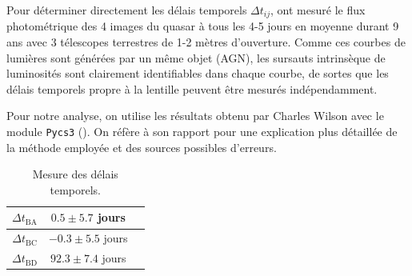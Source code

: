 \documentclass[times,10pt,twocolumn]{article}
\begin{document}
Pour déterminer directement les délais temporels $\Delta t_{ij}$, 
\citet{Tewes2013} ont mesuré le flux photométrique des 4 images du quasar à 
tous les 4-5 jours en moyenne durant 9 ans avec 3 télescopes terrestres de 
1-2 mètres d'ouverture. Comme ces courbes de lumières sont générées par un même objet (AGN), 
les sursauts intrinsèque de luminosités sont clairement identifiables dans chaque courbe, de 
sortes que les délais temporels propre à la lentille peuvent être mesurés indépendamment. 

Pour notre analyse, on utilise les résultats obtenu par Charles Wilson avec le 
module \texttt{Pycs3} (\citet{Millon2020}). On réfère à son rapport pour une explication 
plus détaillée de la méthode employée et des sources possibles d'erreurs.

\begin{table}[H]
        \centering
        \begin{tabular}{ccc}
                \toprule
                $\Delta t_{\mathrm{BA}}$ & $0.5 \pm 5.7$ jours \\\midrule
                $\Delta t_{\mathrm{BC}}$ & $-0.3 \pm 5.5$ jours \\\midrule 
                $\Delta t_{\mathrm{BD}}$ & $92.3 \pm 7.4$ jours \\\bottomrule
        \end{tabular}
        \caption{Mesure des délais temporels.}
        \label{tab:TimeDelay}
\end{table}

\end{document}
